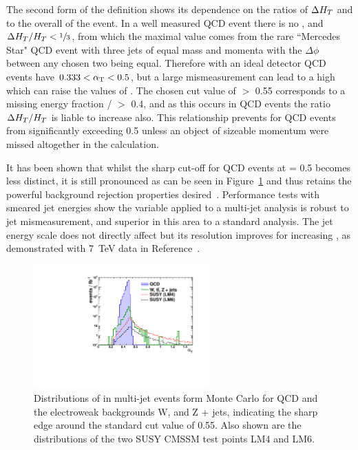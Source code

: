 The second form of the definition shows its dependence on the ratios of $\Delta H_{T} $ and \mht to the overall \HT of the event. In a well measured QCD event there is no \mht, and $\Delta H_{T}  / H_{T}  < \sfrac{1}{3}$, from which the maximal value comes from the rare ``Mercedes Star" QCD event with three jets of equal mass and momenta with the $\Delta \phi$ between any chosen two being equal. Therefore with an ideal detector QCD events have $0.333 < \alpha_{\text{T}} < 0.5$, but a large mismeasurement can lead to a high \mht which can raise the values of \alt. The chosen cut value of \alt $>$ 0.55 corresponds to a missing energy fraction \mht / \HT $>$ 0.4, and as this occurs in QCD events the ratio $\Delta H_{T}  / H_{T} $ is liable to increase also. This relationship prevents \alt for QCD events from significantly exceeding 0.5 unless an object of sizeable momentum were missed altogether in the calculation. 

It has been shown that whilst the sharp cut-off for QCD events at \alt = 0.5 becomes less distinct, it is still pronounced as can be seen in Figure~\ref{fig:atedge} and thus retains the powerful background rejection properties desired~\cite{an2009_56}. Performance tests with smeared jet energies show the \alt variable applied to a multi-jet analysis is robust to jet mismeasurement, and superior in this area to a standard \met analysis. The jet energy scale does not directly affect \alt but its resolution improves for increasing \HT, as demonstrated with 7~TeV data in Reference~\cite{an2010_119}. 

\begin{figure}[htbp]
\begin{center}
\includegraphics[width=0.6\textwidth]{Figures/AlphaT/ThesisATPlot}
\caption{\label{fig:atedge}Distributions of \alt in multi-jet events form Monte Carlo for QCD and the electroweak backgrounds W, \tto and Z + jets, indicating the sharp edge around the standard cut value of 0.55. Also shown are the distributions of the two SUSY CMSSM test points LM4 and LM6.}
\end{center}
\end{figure}


